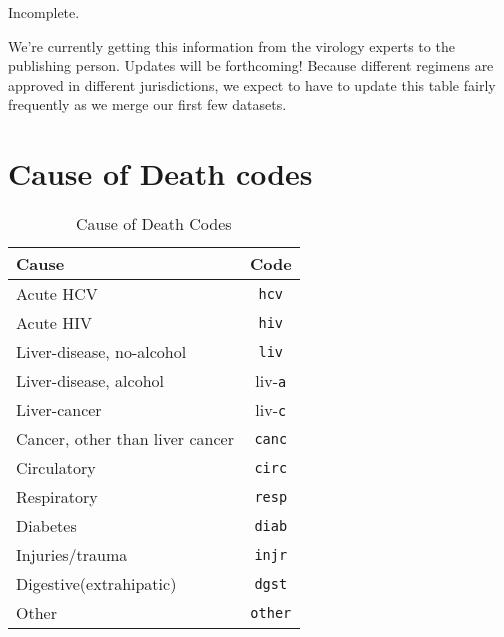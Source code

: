 \documentclass{article}
\begin{document}
Incomplete.

We're currently getting this information from the virology experts to
the publishing person. Updates will be forthcoming! Because different
regimens are approved in different jurisdictions, we expect to have to
update this table fairly frequently as we merge our first few
datasets.


\section{Cause of Death codes}
\label{apx:cod}

\begin{table}[h]
  \centering
  \caption{Cause of Death Codes}
  \label{tbl:cod}
  \begin{tabular}{lc}
    Cause                           & Code  \\ \hline
    Acute HCV                       & \texttt{hcv}   \\
    Acute HIV                       & \texttt{hiv}   \\
    Liver-disease, no-alcohol       & \texttt{liv}   \\
    Liver-disease, alcohol          & liv-\texttt{a} \\
    Liver-cancer                    & liv-\texttt{c} \\
    Cancer, other than liver cancer & \texttt{canc}  \\
    Circulatory                     & \texttt{circ}  \\
    Respiratory                     & \texttt{resp}  \\
    Diabetes                        & \texttt{diab}  \\
    Injuries/trauma                 & \texttt{injr}  \\
    Digestive(extrahipatic)         & \texttt{dgst}  \\
    Other                           & \texttt{other} \\
  \end{tabular}
\end{table}
\end{document}
